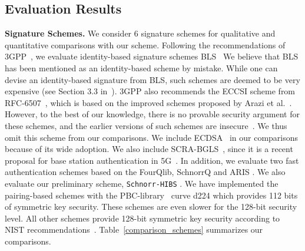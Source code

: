 \subsection{Evaluation Results}
\noindent \textbf{Signature Schemes.}
\label{Sec:counterparts}
We consider 6 signature schemes for qualitative and quantitative comparisons with our scheme. Following the recommendations of 3GPP~\cite{3GPP:33.809}, we evaluate identity-based signature schemes BLS~\cite{boneh2001short}
We believe that BLS has been mentioned as an identity-based scheme by mistake. While one can devise an identity-based signature from BLS, such schemes are deemed to be very expensive (see Section 3.3 in~\cite{DBLP:series/ciss/KiltzN09}).  
3GPP also recommends the ECCSI scheme from RFC-6507~\cite{rfc6507}, which is based on the improved schemes proposed by Arazi et al.~\cite{Arazi-SelfCertified,araz2006load}. However, to the best of our knowledge, there is no provable security argument for these schemes, and the earlier versions of such schemes are insecure~\cite{Arazi-Attacked}. We thus omit this scheme from our comparisons. We include ECDSA~\cite{johnson2001elliptic} in our comparisons because of its wide adoption. We also include SCRA-BGLS~\cite{yavuz2017real}, since it is a recent proposal for base station authentication in 5G~\cite{hussain2019insecure}. 
In addition, we evaluate two fast authentication schemes based on the FourQlib, SchnorrQ \cite{SchnorrQ} and ARIS \cite{ARIS}. We also evaluate our preliminary scheme, \texttt{Schnorr-HIBS} \cite{singla2021look}. 
We have implemented the pairing-based schemes with the PBC-library~\cite{pbc} curve d224 which provides 112 bits of symmetric key security. These schemes are even slower for the 128-bit security level. All other schemes provide 128-bit symmetric key security according to NIST recommendations~\cite{keylength}. 
Table~\ref{comparison_schemes} summarizes our comparisons.

